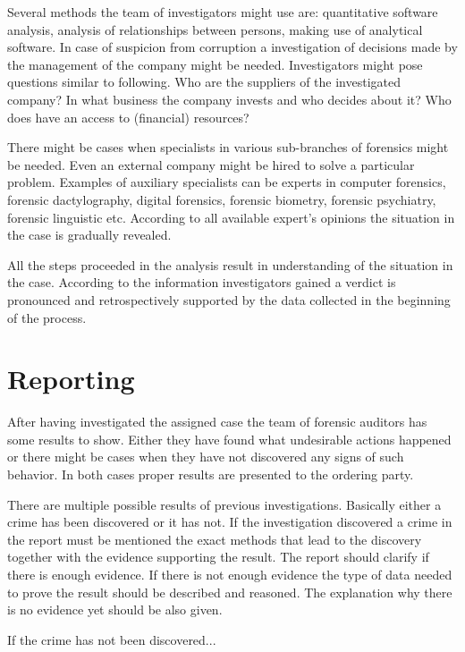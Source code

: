 Several methods the team of investigators might use are: quantitative software analysis, analysis of relationships between persons, making use of analytical software. In case of  suspicion from corruption a investigation of decisions made by the management of the company might be needed. Investigators might pose questions similar to following. Who are the suppliers of the investigated company? In what business the company invests and who decides about it? Who does have an access to (financial) resources?


There might be cases when specialists in various sub-branches of forensics might be needed. Even an external company might be hired to solve a particular problem. Examples of auxiliary specialists can be experts in computer forensics, forensic dactylography, digital forensics, forensic biometry, forensic psychiatry, forensic linguistic etc. According to all available expert's opinions the situation in the case is gradually revealed.

All the steps proceeded in the analysis result in understanding of the situation in the case. According to the information investigators gained a verdict is pronounced and retrospectively supported by the data collected in the beginning of the process. 

\section{Reporting}

After having investigated the assigned case the team of forensic auditors has some results to show. Either they have found what undesirable actions happened or there might be cases when they have not discovered any signs of such behavior. In both cases proper results are presented to the ordering party. 




There are multiple possible results of previous investigations. Basically either a crime has been discovered or it has not. If the investigation discovered a crime in the report must be mentioned the exact methods that lead to the discovery together with the evidence supporting the result. The report should clarify if there is enough evidence. If there is not enough evidence the type of data needed to prove the result should be described and reasoned. The explanation why there is no evidence yet should be also given.


If the crime has not been discovered...


